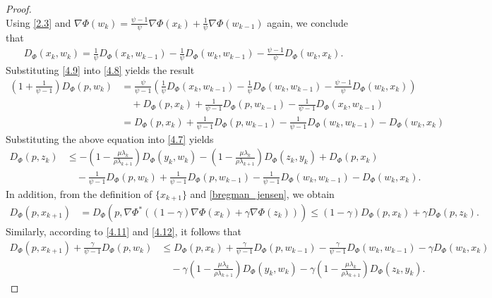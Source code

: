 \documentclass[hidelinks,11 pt]{article}
\numberwithin{equation}{section}
\theoremstyle{definition}  %
\numberwithin{equation}{section}
\numberwithin{theorem}{section}
\begin{document}
\begin{proof}
\begin{equation*}
\end{equation*}
Using \eqref{2.3} and $\nabla \Phi(w_{k})=\frac{\psi-1}{\psi}\nabla {\Phi}(x_{k})+\frac{1}{\psi}\nabla{\Phi}(w_{k-1})$ again, we conclude that 
\begin{align*}
    D_{\Phi}(x_{k},w_{k}) = \frac{1}{\psi} D_{\Phi}(x_{k},w_{k-1})-\frac{1}{\psi} D_{\Phi}(w_{k},w_{k-1})-\frac{\psi-1}{\psi} D_{\Phi}(w_{k},x_{k}). \tag{4.9}\label{4.9}
\end{align*}
Substituting \eqref{4.9} into \eqref{4.8} yields the result
\begin{align*}
    \left(1+\frac{1}{\psi-1}\right)D_{\Phi}(p,w_{k}) & = \frac{\psi}{\psi-1}\left(\frac{1}{\psi} D_{\Phi}(x_{k},w_{k-1})-\frac{1}{\psi} D_{\Phi}(w_{k},w_{k-1})-\frac{\psi-1}{\psi} D_{\Phi}(w_{k},x_{k})\right)\\
    &\quad+D_{\Phi}(p,x_{k})+\frac{1}{\psi-1}D_{\Phi}(p,w_{k-1})-\frac{1}{\psi-1}D_{\Phi}(x_{k},w_{k-1})\\
    & = D_{\Phi}(p,x_{k})+\frac{1}{\psi-1}D_{\Phi}(p,w_{k-1})-\frac{1}{\psi-1} D_{\Phi}(w_{k},w_{k-1})-D_{\Phi}(w_{k},x_{k})\tag{4.10}\label{4.10}
\end{align*}
Substituting the above equation into \eqref{4.7} yields
\begin{align*}
     D_{\Phi}(p, z_k)&\leq -\left(1-\frac{\mu\lambda_{k}}{\rho\lambda_{k+1}}\right) D_{\Phi}(y_k, w_k) -\left(1-\frac{\mu\lambda_{k}}{\rho\lambda_{k+1}}\right) D_{\Phi}(z_k, y_k)+D_{\Phi}(p, x_k)\\
     &\quad -\frac{1}{\psi-1}D_{\Phi}(p, w_k)+\frac{1}{\psi-1}D_{\Phi}(p, w_{k-1})-\frac{1}{\psi-1}D_{\Phi}(w_k, w_{k-1})-D_{\Phi}(w_{k},x_{k}).\tag{4.11}\label{4.11}
\end{align*}
In addition, from the definition of $\{x_{k+1}\}$ and \eqref{bregman_jensen}, we obtain 
\begin{align*}
    D_{\Phi}(p,x_{k+1}) &= D_{\Phi}(p,\nabla \Phi^{*} \left( (1 - \gamma) \nabla \Phi(x_k) + \gamma \nabla \Phi(z_k) \right))
    \leq (1-\gamma)D_{\Phi}(p,x_{k})+\gamma D_{\Phi}(p,z_{k}).\tag{4.12}\label{4.12}
\end{align*}
Similarly, according to \eqref{4.11} and \eqref{4.12}, it follows that 
\begin{align*}
    D_{\Phi}(p,x_{k+1})+\frac{\gamma}{\psi-1}D_{\Phi}(p,w_{k})&\leq  D_{\Phi}(p,x_{k})+\frac{\gamma}{\psi-1}D_{\Phi}(p,w_{k-1})-\frac{\gamma}{\psi-1}D_{\Phi}(w_k,w_{k-1})-\gamma D_{\Phi}(w_{k},x_{k})\\
    &\quad -\gamma\left(1-\frac{\mu\lambda_{k}}{\rho\lambda_{k+1}}\right) D_{\Phi}(y_k, w_k) -\gamma\left(1-\frac{\mu\lambda_{k}}{\rho\lambda_{k+1}}\right) D_{\Phi}(z_k, y_k).\tag{4.13}\label{4.13}

\end{align*}
\end{proof}
\end{document}
